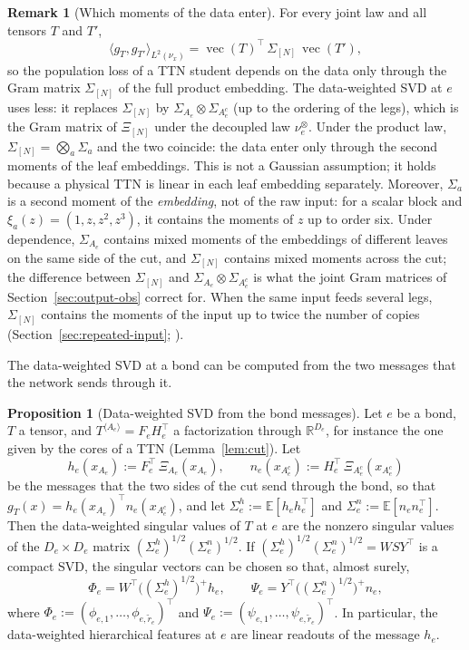 \documentclass[11pt]{article}
\newcommand{\R}{\mathbb{R}}
\newcommand{\E}{\mathbb{E}}
\newcommand{\vect}{\operatorname{vec}}
\theoremstyle{definition}
\newtheorem{proposition}[theorem]{Proposition}
\newtheorem{remark}[theorem]{Remark}
\numberwithin{equation}{section}
\begin{document}
\begin{remark}[Which moments of the data enter]\label{rem:second-moments}
For every joint law and all tensors $T$ and $T'$,
\begin{equation}\label{eq:moment-operator}
\langle g_T,g_{T'}\rangle_{L^2(\nu_x)}=\vect(T)^\top\,\Sigma_{[N]}\,\vect(T'),
\end{equation}
so the population loss of a TTN student depends on the data only through the Gram matrix $\Sigma_{[N]}$ of the full product embedding. The data-weighted SVD at $e$ uses less: it replaces $\Sigma_{[N]}$ by $\Sigma_{A_e}\otimes\Sigma_{A_e^c}$ (up to the ordering of the legs), which is the Gram matrix of $\Xi_{[N]}$ under the decoupled law $\nu^\otimes_e$. Under the product law, $\Sigma_{[N]}=\bigotimes_a\Sigma_a$ and the two coincide: the data enter only through the second moments of the leaf embeddings. This is not a Gaussian assumption; it holds because a physical TTN is linear in each leaf embedding separately. Moreover, $\Sigma_a$ is a second moment of the \emph{embedding}, not of the raw input: for a scalar block and $\xi_a(z)=(1,z,z^2,z^3)$, it contains the moments of $z$ up to order six. Under dependence, $\Sigma_{A_e}$ contains mixed moments of the embeddings of different leaves on the same side of the cut, and $\Sigma_{[N]}$ contains mixed moments across the cut; the difference between $\Sigma_{[N]}$ and $\Sigma_{A_e}\otimes\Sigma_{A_e^c}$ is what the joint Gram matrices of Section~\ref{sec:output-obs} correct for. When the same input feeds several legs, $\Sigma_{[N]}$ contains the moments of the input up to twice the number of copies (Section~\ref{sec:repeated-input}; \citealp[Section~8.1]{hfl_local}).
\end{remark}

The data-weighted SVD at a bond can be computed from the two messages that the network sends through it.

\begin{proposition}[Data-weighted SVD from the bond messages]\label{prop:bond-messages}
Let $e$ be a bond, $T$ a tensor, and $T^{\langle A_e\rangle}=F_eH_e^\top$ a factorization through $\R^{D_e}$, for instance the one given by the cores of a TTN (Lemma~\ref{lem:cut}). Let
\[
h_e(x_{A_e}):=F_e^\top\,\Xi_{A_e}(x_{A_e}),\qquad n_e(x_{A_e^c}):=H_e^\top\,\Xi_{A_e^c}(x_{A_e^c})
\]
be the messages that the two sides of the cut send through the bond, so that $g_T(x)=h_e(x_{A_e})^\top n_e(x_{A_e^c})$, and let $\Sigma^h_e:=\E[h_eh_e^\top]$ and $\Sigma^n_e:=\E[n_en_e^\top]$. Then the data-weighted singular values of $T$ at $e$ are the nonzero singular values of the $D_e\times D_e$ matrix $(\Sigma^h_e)^{1/2}(\Sigma^n_e)^{1/2}$. If $(\Sigma^h_e)^{1/2}(\Sigma^n_e)^{1/2}=WSY^\top$ is a compact SVD, the singular vectors can be chosen so that, almost surely,
\[
\Phi_e=W^\top\big((\Sigma^h_e)^{1/2}\big)^+h_e,\qquad\Psi_e=Y^\top\big((\Sigma^n_e)^{1/2}\big)^+n_e,
\]
where $\Phi_e:=(\phi_{e,1},\dots,\phi_{e,\tilde r_e})^\top$ and $\Psi_e:=(\psi_{e,1},\dots,\psi_{e,\tilde r_e})^\top$. In particular, the data-weighted hierarchical features at $e$ are linear readouts of the message $h_e$.
\end{proposition}
\end{document}
